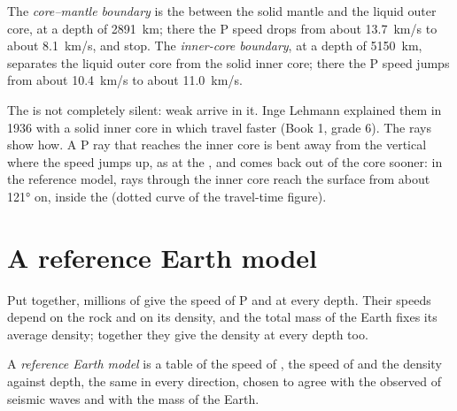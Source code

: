 \begin{definition}\label{def:g11:seismic-structure:core}
The \emph{core--mantle boundary} is the  between the solid mantle and the liquid outer core, at a depth
of \qty{2891}{km}; there the P speed drops from about \qty{13.7}{km/s} to
about \qty{8.1}{km/s}, and  stop. The \emph{inner-core
boundary}, at a depth of \qty{5150}{km}, separates
the liquid outer core from the solid inner core; there the P speed jumps from
about \qty{10.4}{km/s} to about \qty{11.0}{km/s}.
\end{definition}

The  is not completely silent: weak  arrive in it. Inge
Lehmann explained them in 1936 with a solid inner core in which 
travel faster (Book 1, grade 6). The rays show how. A P ray that reaches the
inner core is bent away from the vertical where the speed jumps up, as at the
, and comes back out of the core sooner: in the reference model, rays
through the inner core reach the surface from about \ang{121} on, inside the
 (dotted curve of the travel-time figure).

\section{A reference Earth model}\label{sec:g11:seismic-structure:model}

Put together, millions of  give the speed of P and  at
every depth. Their speeds depend on the rock and on its density, and the
total mass of the Earth fixes its average density; together they give the
density at every depth too.

\begin{definition}\label{def:g11:seismic-structure:reference-model}
A \emph{reference Earth model} is a table of the
speed of , the speed of  and the density against depth, the
same in every direction, chosen to agree with the observed  of
seismic waves and with the mass of the Earth.
\end{definition}

